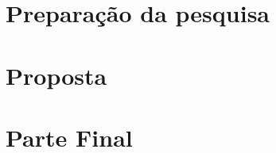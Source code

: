 \documentclass[
	12pt,					%
	openright,				%
	twoside,					%
	a4paper,					%
	english,					%
	brazil					%
	]{abntex2}
\numberwithin{equation}{subsection}
\begin{document}
\part{Preparação da pesquisa}




\part{Proposta}


\part{Parte Final}



\postextual

% 







\end{document}
